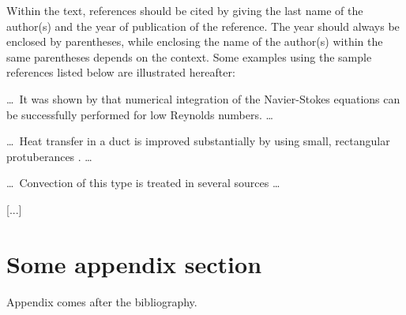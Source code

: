 \documentclass{stabs2021}
\begin{document}
Within the text, references should be cited by giving the last name of
the author(s) and the year of publication of the reference. The year
should always be enclosed by parentheses, while enclosing the name of
the author(s) within the same parentheses depends on the context. Some
examples using the sample references listed below are illustrated
hereafter:

\dots\ It was shown by \citet{kwon1981prediction} that numerical
integration of the Navier-Stokes equations can be successfully
performed for low Reynolds numbers. \dots

\dots\ Heat transfer in a duct is improved substantially by using
small, rectangular protuberances \citep{sparrow1980forced}. \dots

\dots\ Convection of this type is treated in several sources
\citep{lee1982structure, sparrow1980fluid, tung1982evaporative} \dots

[...]



\appendix

\section{Some appendix section}

Appendix comes after the bibliography.
\end{document}
